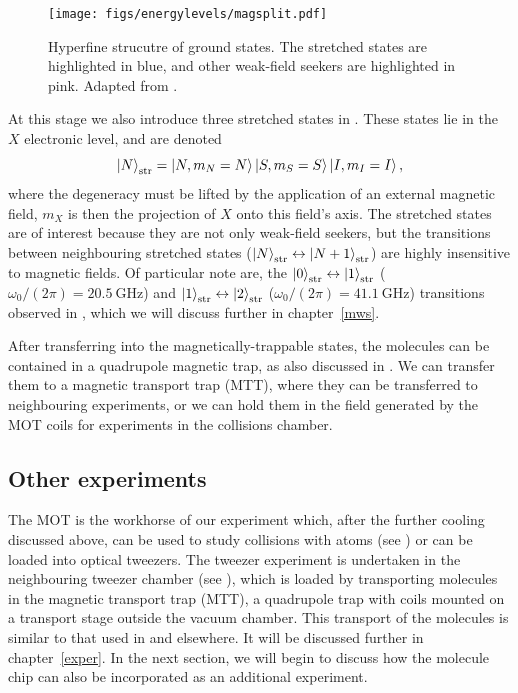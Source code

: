 \begin{figure}
  \centering
  \texttt{[image: figs/energylevels/magsplit.pdf]}
  \caption[Hyperfine structe in \CaF{}]{
    Hyperfine strucutre of \CaF{} ground states. The stretched states
    are highlighted in blue, and other weak-field seekers are highlighted in
    pink. Adapted from .}
  \label{overview:fig:magtrapstates}
\end{figure}


At this stage we also introduce three stretched states in \CaF{}. These states
lie in the $X$ electronic level, and are denoted
%
\begin{equation}
  \ket{N}_\text{str} = \ket{N, m_N=N}\ket{S, m_S=S}\ket{I,m_I=I},
  \label{theory:eqn:stretched}
\end{equation}
%
where the degeneracy must be lifted by the application of an external magnetic
field, $m_X$ is then the projection of $X$ onto this field's axis. The
stretched states are of interest because they are not only weak-field seekers,
but the transitions between neighbouring stretched states
($\ket{N}_\text{str}\leftrightarrow\ket{N+1}_\text{str}$) are highly
insensitive to magnetic fields. Of particular note are, the
$\ket{0}_\text{str}\leftrightarrow\ket{1}_\text{str}$ ($\omega_0/(2\pi) =
\SI{20.5}{\giga\hertz}$) and
$\ket{1}_\text{str}\leftrightarrow\ket{2}_\text{str}$ ($\omega_0/(2\pi) =
\SI{41.1}{\giga\hertz}$) transitions observed in
, which we will discuss further in
chapter~\ref{mws}.

After transferring into the magnetically-trappable states, the molecules can be
contained in a quadrupole magnetic trap, as also discussed in
. We can transfer them to a magnetic transport
trap (MTT), where they can be transferred to neighbouring experiments, or we
can hold them in the field generated by the MOT coils for experiments in the
collisions chamber.

\subsection{Other experiments}

The \CaF{} MOT is the workhorse of our experiment which, after the further
cooling discussed above, can be used to study collisions with \Rb{} atoms (see
) or can be
loaded into optical tweezers. The tweezer experiment is undertaken in the
neighbouring tweezer chamber (see ), which
is loaded by transporting molecules in the magnetic transport trap (MTT), a
quadrupole trap with coils mounted on a transport stage outside the vacuum
chamber. This transport of the molecules is similar to that used in
 and elsewhere. It will be
discussed further in chapter~\ref{exper}. In the next section, we will begin to
discuss how the molecule chip can also be incorporated as an additional
experiment.


